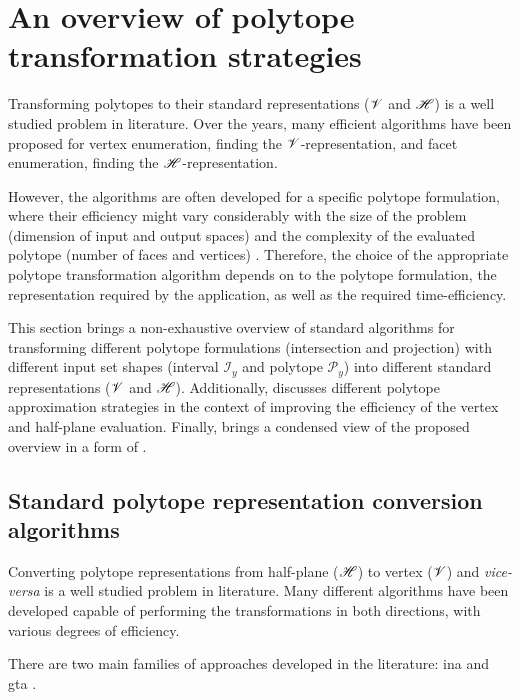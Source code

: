 \section{An overview of polytope transformation strategies} 
\label{ch:polytope_algorithms}

Transforming polytopes to their standard representations ($\mathscr{V}$ and $\mathscr{H}$) is a well studied problem in literature. Over the years, many efficient algorithms  \cite{bremner_fukuda_marzetta_1998,fukuda_dd,avis_pivoting_nodate} have been proposed for vertex enumeration, finding the $\mathscr{V}$-representation, and facet enumeration, finding the $\mathscr{H}$-representation. 

However, the algorithms are often developed for a specific polytope formulation, where their efficiency might vary considerably with the size of the problem (dimension of input and output spaces) \cite{avis_comparative_2015} and the complexity of the evaluated polytope (number of faces and vertices) \cite{Dyer1983}. Therefore, the choice of the appropriate polytope transformation algorithm depends on to the polytope formulation, the representation required by the application, as well as the required time-efficiency.

This section brings a non-exhaustive overview of standard algorithms for transforming different polytope formulations (intersection and projection) with different input set shapes (interval $\mathcal{I}_y$ and polytope $\mathcal{P}_y$) into different standard representations ($\mathscr{V}$ and $\mathscr{H}$). Additionally,  discusses different polytope approximation strategies in the context of improving the efficiency of the vertex and half-plane evaluation. Finally,  brings a condensed view of the proposed overview in a form of .

\subsection{Standard polytope representation conversion algorithms}
\label{ch:standard_represtantion_conversion}

Converting polytope representations from half-plane ($\mathscr{H}$) to vertex ($\mathscr{V}$) and \textit{vice-versa} is a well studied problem in literature. Many different algorithms have been developed capable of performing the transformations in both directions, with various degrees of efficiency. 

There are two main families of approaches developed in the literature: \gls{ina} and \gls{gta} \cite[Chapter 8.]{fukuda2016lecture} \cite{avis1997how}.

